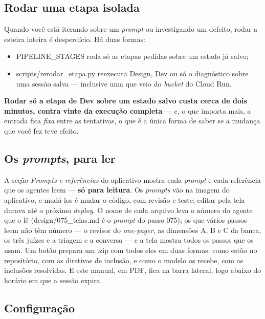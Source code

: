 \documentclass[11pt,a4paper]{article}
\newcommand{\cod}[1]{{\ttfamily\small #1}}
\begin{document}
\subsection{Rodar uma etapa isolada}

Quando você está iterando sobre um \emph{prompt} ou investigando um defeito, rodar a esteira inteira é desperdício. Há duas formas:

\begin{itemize}
  \item \cod{PIPELINE\_STAGES} roda só as etapas pedidas sobre um estado já salvo;
  \item \cod{scripts/rerodar\_etapa.py} reexecuta Design, Dev ou só o diagnóstico sobre uma sessão salva --- inclusive uma que veio do \emph{bucket} do Cloud Run.
\end{itemize}

\begin{destaque}
\textbf{Rodar só a etapa de Dev sobre um estado salvo custa cerca de dois minutos, contra vinte da execução completa} --- e, o que importa mais, a entrada fica \emph{fixa} entre as tentativas, o que é a única forma de saber se a mudança que você fez teve efeito.
\end{destaque}

\subsection{Os \emph{prompts}, para ler}

A seção \emph{Prompts e referências} do aplicativo mostra cada \emph{prompt} e cada referência que os agentes leem --- \textbf{só para leitura}. Os \emph{prompts} vão na imagem do aplicativo, e mudá-los é mudar o código, com revisão e teste; editar pela tela durava até o próximo \emph{deploy}. O nome de cada arquivo leva o número do agente que o lê (\cod{design/075\_telas.md} é o \emph{prompt} do passo 075); os que vários passos leem não têm número --- o revisor do \emph{one-pager}, as dimensões A, B e C da banca, os três juízes e a triagem e a conversa --- e a tela mostra todos os passos que os usam. Um botão prepara um \cod{.zip} com todos eles em duas formas: como estão no repositório, com as diretivas de inclusão, e como o modelo os recebe, com as inclusões resolvidas. E este manual, em PDF, fica na barra lateral, logo abaixo do horário em que a sessão expira.

\subsection{Configuração}
\end{document}
